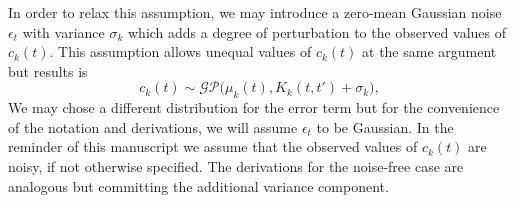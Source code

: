 In order to relax this assumption, we may introduce a zero-mean Gaussian noise $\epsilon_t$ with variance $\sigma_k$ which adds  a degree of perturbation to the observed values of $c_k(t)$. This assumption allows unequal values of $c_k(t)$ at the same argument but results is  
\begin{equation}\label{eq:model_IMF_GP_k_noisy}
c_k(t) \sim \mathcal{GP} \Big( \mu_k(t), K_k(t,t')+ \sigma_k\Big), 
\end{equation}
We may chose a different distribution for the error term but for the convenience of the notation and derivations, we will assume $\epsilon_t$ to be Gaussian.  In the reminder of this manuscript we assume that the observed values of $c_k(t)$ are noisy, if not otherwise specified. The derivations for the noise-free case are analogous but committing the additional variance component.


